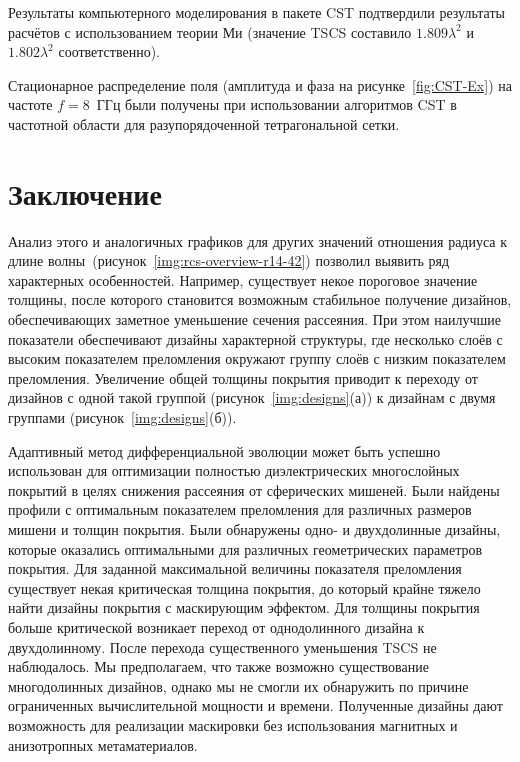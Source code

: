 Результаты компьютерного моделирования в пакете CST подтвердили
результаты расчётов с использованием теории Ми (значение TSCS
составило $1.809\lambda^2$ и $1.802\lambda^2$ соответственно).

Стационарное распределение поля (амплитуда  и фаза на
рисунке~\ref{fig:CST-Ex}) на частоте ${f = 8}$~ГГц были получены при
использовании алгоритмов CST в частотной области для разупорядоченной
тетрагональной сетки.



\section{Заключение}
Анализ этого и аналогичных графиков для других значений отношения
радиуса к длине волны~(рисунок~\ref{img:rcs-overview-r14-42}) позволил
выявить ряд характерных особенностей. Например, существует некое
пороговое значение толщины, после которого становится возможным
стабильное получение дизайнов, обеспечивающих заметное уменьшение
сечения рассеяния. При этом наилучшие показатели обеспечивают дизайны
характерной структуры, где несколько слоёв с высоким показателем
преломления окружают группу слоёв с низким показателем
преломления. Увеличение общей толщины покрытия приводит к переходу от
дизайнов с одной такой группой (рисунок~\ref{img:designs}(а)) к
дизайнам с двумя группами (рисунок~\ref{img:designs}(б)).




Адаптивный метод дифференциальной эволюции может быть успешно
использован для оптимизации полностью диэлектрических многослойных
покрытий в целях снижения рассеяния от сферических мишеней.  Были
найдены профили с оптимальным показателем преломления для различных
размеров мишени и толщин покрытия.  Были обнаружены одно- и
двухдолинные дизайны, которые оказались оптимальными для различных
геометрических параметров покрытия.  Для заданной максимальной
величины показателя преломления существует некая критическая толщина
покрытия, до который крайне тяжело найти дизайны покрытия с
маскирующим эффектом.  Для толщины покрытия больше критической
возникает переход от однодолинного дизайна к двухдолинному.  После
перехода существенного уменьшения TSCS не наблюдалось.  Мы
предполагаем, что также возможно существование многодолинных дизайнов,
однако мы не смогли их обнаружить по причине ограниченных
вычислительной мощности и времени.  Полученные дизайны дают
возможность для реализации маскировки без использования магнитных и
анизотропных метаматериалов.
   


